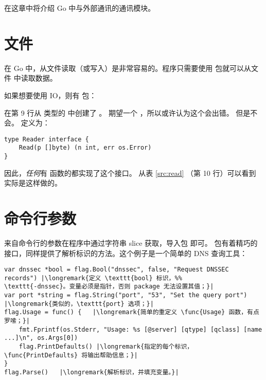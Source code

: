 \noindent{}在这章中将介绍 Go 中与外部通讯的通讯模块。

\section{文件}
在 Go 中，从文件读取（或写入）是非常容易的。程序只需要使用
 包就可以从文件  中读取数据。

如果想要使用 IO，则有
 包：

在第 9 行从  类型的  中创建了 。
 期望一个 ，所以或许认为这个会出错。
但是不会。 定义为：
\begin{lstlisting}
type Reader interface {
    Read(p []byte) (n int, err os.Error)
}
\end{lstlisting}
因此，\emph{任何}有  函数的都实现了这个接口。
从表 \ref{src:read} （第 10 行）可以看到  实际是这样做的。

\section{命令行参数}
\label{sec:option parsing}
来自命令行的参数在程序中通过字符串 slice  获取，导入包  即可。
 包有着精巧的接口，同样提供了解析标识的方法。这个例子是一个简单的 DNS 查询工具：
\begin{lstlisting}
var dnssec *bool = flag.Bool("dnssec", false, "Request DNSSEC records") |\longremark{定义 \texttt{bool} 标识，%%
\texttt{-dnssec}。变量必须是指针，否则 package 无法设置其值；}|
var port *string = flag.String("port", "53", "Set the query port")      |\longremark{类似的，\texttt{port} 选项；}|
flag.Usage = func() {   |\longremark{简单的重定义 \func{Usage} 函数，有点罗嗦；}|
    fmt.Fprintf(os.Stderr, "Usage: %s [@server] [qtype] [qclass] [name ...]\n", os.Args[0])
    flag.PrintDefaults() |\longremark{指定的每个标识，\func{PrintDefaults} 将输出帮助信息；}|
}
flag.Parse()   |\longremark{解析标识，并填充变量。}|
\end{lstlisting}
\showremarks

